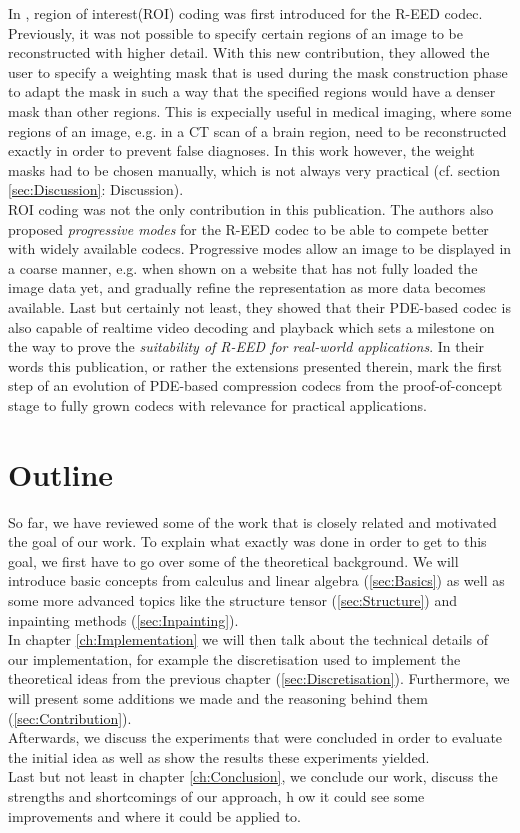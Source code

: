 In \cite{peter15}, region of interest(ROI) coding was first introduced for the R-EED codec. Previously,
it was not possible to specify certain regions of an image to be reconstructed with higher detail.
With this new contribution, they allowed the user to specify a weighting mask that is used during
the mask construction phase to adapt the mask in such a way that the specified regions would have a
denser mask than other regions. This is expecially useful in medical imaging, where some regions of
an image, e.g. in a CT scan of a brain region, need to be reconstructed exactly in order to prevent
false diagnoses. In this work however, the weight masks had to be chosen manually, which is not
always very practical (cf. section \ref{sec:Discussion}: Discussion).
\\
ROI coding was not the only contribution in this publication. The authors also proposed
\textit{progressive modes} for the R-EED codec to be able to compete better with widely available codecs.
Progressive modes allow an image to be displayed in a coarse manner, e.g. when shown on a website
that has not fully loaded the image data yet, and gradually refine the representation as more data
becomes available. Last but certainly not least, they showed that their PDE-based codec is also
capable of realtime video decoding and playback which sets a milestone on the way to prove the
\textit{suitability of R-EED for real-world applications}\cite{peter15}. In their words this
publication, or rather the extensions presented therein, mark the first step of an evolution of
PDE-based compression codecs from the proof-of-concept stage to fully grown codecs with relevance
for practical applications.\cite{peter15}\\

\section{Outline}
So far, we have reviewed some of the work that is closely related and motivated the goal of our work.
To explain what exactly was done in order to get to this goal, we first have to go over some of the
theoretical background. We will introduce basic concepts from
calculus and linear algebra (\ref{sec:Basics}) as well as some more advanced topics
like the structure tensor (\ref{sec:Structure}) and
inpainting methods (\ref{sec:Inpainting}).\\
In chapter \ref{ch:Implementation} we will then talk about the technical details of our 
implementation, for example the discretisation used to implement the theoretical ideas from 
the previous chapter (\ref{sec:Discretisation}). 
Furthermore, we will present some additions we made and the reasoning behind them
(\ref{sec:Contribution}).\\
Afterwards, we discuss the experiments that were concluded in order to evaluate the initial idea as
well as show the results these experiments yielded.\\
Last but not least in chapter \ref{ch:Conclusion}, we conclude our work, discuss the strengths
and shortcomings of our approach, h ow it could see some improvements and where it could be
applied to.\\


